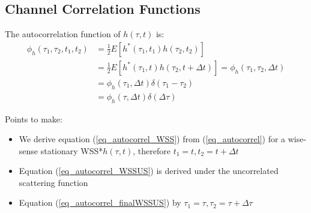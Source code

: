 \subsection{Channel Correlation Functions}
The autocorrelation function of $h(\tau,t)$ is:
\begin{align}
    \phi_h(\tau_1,\tau_2,t_1,t_2) &= \frac{1}{2} E \left[ h^*(\tau_1,t_1) h(\tau_2,t_2) \right] \label{eq_autocorrel} \\
    &= \frac{1}{2} E \left[ h^*(\tau_1,t) h(\tau_2, t+\Delta t) \right] = \phi_h(\tau_1,\tau_2,\Delta t) \label{eq_autocorrel_WSS}\\
    &= \phi_h (\tau_1,\Delta t) \delta(\tau_1 - \tau_2) \label{eq_autocorrel_WSSUS}\\
    &= \phi_h (\tau,\Delta t) \delta(\Delta\tau) \label{eq_autocorrel_finalWSSUS}
\end{align}

Points to make:
\begin{itemize}
    \item We derive equation (\ref{eq_autocorrel_WSS}) from (\ref{eq_autocorrel}) for a wise-sense stationary WSS*$h(\tau,t)$, therefore $t_1 = t, t_2 = t + \Delta t$
    \item Equation (\ref{eq_autocorrel_WSSUS}) is derived under the uncorrelated scattering function
    \item Equation (\ref{eq_autocorrel_finalWSSUS}) by $\tau_1 = \tau, \tau_2 = \tau + \Delta\tau$
\end{itemize}

